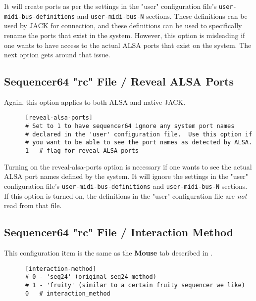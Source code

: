    It will create ports as per the settings in the "user" configuration file's
   \texttt{user-midi-bus-definitions} and \texttt{user-midi-bus-N} sections.
   These definitions can be used by JACK for connection, and these definitions
   can be used to specifically rename the ports that exist in the system.
   However, this option is misleading if one wants to have access to the
   actual ALSA ports that exist on the system.
   The next option gets around that issue.

\subsection{Sequencer64 "rc" File / Reveal ALSA Ports}
\label{subsec:seq64_rc_file_reveal_ports}

   Again, this option applies to both ALSA and native JACK.

   \begin{verbatim}
      [reveal-alsa-ports]
      # Set to 1 to have sequencer64 ignore any system port names
      # declared in the 'user' configuration file.  Use this option if
      # you want to be able to see the port names as detected by ALSA.
      1   # flag for reveal ALSA ports
   \end{verbatim}

   Turning on the reveal-alsa-ports option is necessary if one
   wants to see the actual ALSA port names defined by the system.
   It will ignore the settings in the "user" configuration file's
   \texttt{user-midi-bus-definitions} and \texttt{user-midi-bus-N} sections.
   If this option is turned on, the definitions in the
   "user" configuration file are \textsl{not} read from that file.

\subsection{Sequencer64 "rc" File / Interaction Method}
\label{subsec:seq64_rc_file_interaction}

   This configuration item is the same as the 
   \textbf{Mouse} tab described in
   .

   \begin{verbatim}
      [interaction-method]
      # 0 - 'seq24' (original seq24 method)
      # 1 - 'fruity' (similar to a certain fruity sequencer we like)
      0   # interaction_method
   \end{verbatim}

